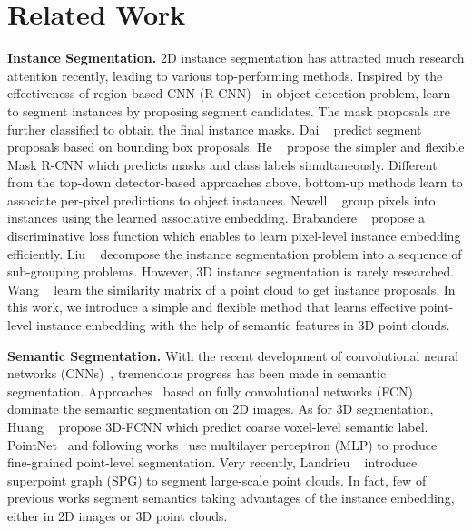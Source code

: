 \documentclass[10pt,twocolumn,letterpaper]{article}
\newcommand{\myparagraph}[1]{{\vspace{0.5em} \noindent \bf #1}}
\begin{document}
\section{Related Work}

\myparagraph{Instance Segmentation.}
2D instance segmentation has attracted much research attention recently, leading to various top-performing methods. 
Inspired by the effectiveness of region-based CNN (R-CNN)~\cite{Girshick_2014_CVPR} in object detection problem, \cite{DeepMask, dai2016instance1} learn to segment instances by proposing segment candidates. The mask proposals are further classified to obtain the final instance masks. 
Dai \etal~\cite{dai2016instance2} predict segment proposals based on bounding box proposals. 
He \etal~\cite{he2017mask} propose the simpler and flexible Mask R-CNN which predicts masks and class labels simultaneously.
Different from the top-down detector-based approaches above, bottom-up methods learn to associate per-pixel predictions to object instances.
Newell \etal~\cite{associativeembedding} group pixels into instances using the learned associative embedding. 
Brabandere \etal~\cite{de2017semantic} propose a discriminative loss function which enables to learn pixel-level instance embedding efficiently. 
Liu \etal~\cite{SGN17} decompose the instance segmentation problem into a sequence of sub-grouping problems.
However, 3D instance segmentation is rarely researched. 
Wang \etal~\cite{sgpn} learn the similarity matrix of a point cloud to get instance proposals. 
In this work, we introduce a simple and flexible method that learns effective point-level instance embedding with the help of semantic features in 3D point clouds.


\myparagraph{Semantic Segmentation.}
With the recent development of convolutional neural networks (CNNs)~\cite{krizhevsky2012imagenet,simonyan2014very},  tremendous  progress has been made in semantic segmentation. 
Approaches~\cite{lin2017refinenet,chen2017rethinking,Lin2017Semantic} based on fully convolutional networks (FCN)~\cite{long2015fully} dominate the semantic segmentation on 2D images. 
As for 3D segmentation, Huang \etal~\cite{3dfcnn} propose 3D-FCNN which predict coarse voxel-level semantic label.
PointNet~\cite{Qi_2017_CVPR} and following works~\cite{3dsemseg_ICCVW17,Ye_2018_ECCV} use multilayer perceptron (MLP) to produce fine-grained point-level segmentation.
Very recently, Landrieu \etal~\cite{Landrieu_2018_CVPR} introduce superpoint graph (SPG) to segment large-scale point clouds.
In fact, few of previous works segment semantics taking advantages of the instance embedding, either in 2D images or 3D point clouds.
\end{document}
